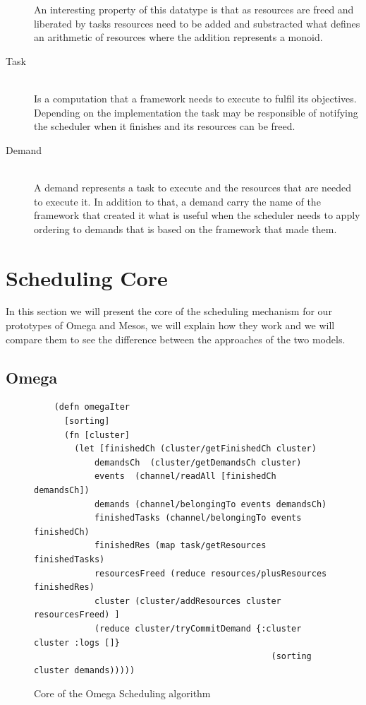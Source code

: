 \documentclass{report}                     %
\begin{document}
\begin{description}
  An interesting property of this datatype is that as resources are
  freed and liberated by tasks resources need to be added and
  substracted what defines an arithmetic of resources where the
  addition represents a monoid.
  \item[Task] \hfill \\
  Is a computation that a framework needs to execute to fulfil its
  objectives. Depending on the implementation the task may be
  responsible of notifying the scheduler when it finishes and its
  resources can be freed.
  \item[Demand] \hfill \\
  A demand represents a task to execute and the resources that are
  needed to execute it. In addition to that, a demand  carry the
  name of the framework that created it what is useful when the
  scheduler needs to apply ordering to demands that is based on the
  framework that made them.

\end{description}

\section{Scheduling Core}

In this section we will present the core of the scheduling mechanism
for our prototypes of Omega and Mesos, we will explain how they work
and we will compare them to see the difference between the approaches
of the two models.

\subsection{Omega}

\begin{figure}[!ht]
\centering
\begin{verbatim}
    (defn omegaIter
      [sorting]
      (fn [cluster]
        (let [finishedCh (cluster/getFinishedCh cluster)
            demandsCh  (cluster/getDemandsCh cluster)
            events  (channel/readAll [finishedCh demandsCh])
            demands (channel/belongingTo events demandsCh)
            finishedTasks (channel/belongingTo events finishedCh)
            finishedRes (map task/getResources finishedTasks)
            resourcesFreed (reduce resources/plusResources finishedRes)
            cluster (cluster/addResources cluster resourcesFreed) ]
            (reduce cluster/tryCommitDemand {:cluster cluster :logs []} 
                                               (sorting cluster demands)))))

\end{verbatim}
\caption{Core of the Omega Scheduling algorithm}
\label{fig:omega-implementation}
\end{figure}
\end{document}
